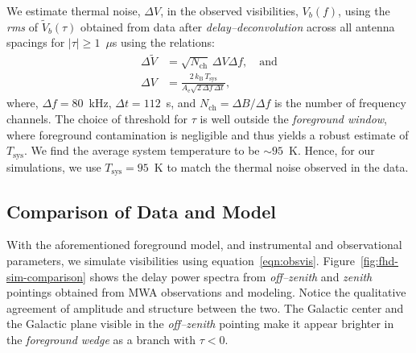 \documentclass[preprint2,iop,numberedappendix,twocolappendix,appendixfloats]{emulateapj}
\begin{document}

We estimate thermal noise, $\Delta V$, in the observed visibilities, $V_b(f)$, using the {\it rms} of $\tilde{V}_b(\tau)$ obtained from data after {\it delay--deconvolution} across all antenna spacings for $|\tau| \geq 1$~$\mu$s using the relations:
\begin{align}\label{eqn:Tsys}
  \Delta \tilde{V} &= \sqrt{N_\textrm{ch}}\,\Delta V \Delta f, \quad\textrm{and} \\
  \Delta V &= \frac{2\,k_\textrm{B}\,T_\textrm{sys}}{A_\textrm{e}\sqrt{2\,\Delta f\,\Delta t}},
\end{align}
where, $\Delta f = 80$~kHz, $\Delta t = 112$~s, and $N_\textrm{ch}=\Delta B/\Delta f$ is the number of frequency channels. The choice of threshold for $\tau$ is well outside the {\it foreground window}, where foreground contamination is negligible and thus yields a robust estimate of $T_\textrm{sys}$. We find the average system temperature to be $\sim 95$~K. Hence, for our simulations, we use $T_\textrm{sys}=95$~K to match the thermal noise observed in the data. 

\subsection{Comparison of Data and Model}\label{sec:data-vs-model}

With the aforementioned foreground model, and instrumental and observational parameters, we simulate visibilities using equation~\ref{eqn:obsvis}. Figure~\ref{fig:fhd-sim-comparison} shows the delay power spectra from {\it off--zenith} and {\it zenith} pointings obtained from MWA observations and modeling. Notice the qualitative agreement of amplitude and structure between the two. The Galactic center and the Galactic plane visible in the {\it off--zenith} pointing make it appear brighter in the {\it foreground wedge} as a branch with $\tau<0$. 
\end{document}
